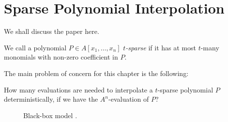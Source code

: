\chapter{Sparse Polynomial Interpolation}
\label{ch:benor-tiwari}

We shall discuss the paper \cite{ben-or-tiwari} here.

\begin{definition}
    We call a polynomial $P\in A[x_1,\ldots,x_n]$ \emph{$t$-sparse} if it has at most $t$-many monomials with non-zero coefficient in $P$.
\end{definition}

The main problem of concern for this chapter is the following:

\begin{blackbox}
    \begin{problem}
           How many evaluations are needed to interpolate a $t$-sparse polynomial $P$ deterministically, if we have the $A^n$-evaluation of $P$?
    \end{problem}
\end{blackbox}

\begin{figure}[h]
\centering
{}
\caption{Black-box model \textup{\cite{ben-or-tiwari}}.}
\label{fig:blackbox}
\end{figure}

